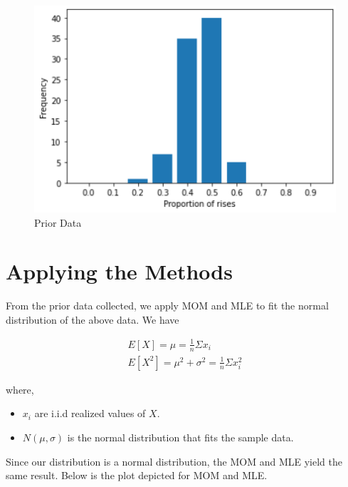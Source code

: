 \documentclass[conference]{IEEEtran}
\begin{document}
\begin{figure}[htbp]
    \centerline{\includegraphics[scale=0.85]{Images/FreqVsRise.png}}
    \caption{Prior Data}
    \label{fig}
\end{figure}


\section{Applying the Methods}
    \par From the prior data collected, we apply MOM and MLE to fit the normal distribution of the above data. We have
    
    \begin{gather*}
        E[X] = \mu = \frac{1}{n}\Sigma x_{i} \\ 
        E[X^2] = \mu^2 + \sigma^2 = \frac{1}{n}\Sigma x_{i}^{2}
    \end{gather*}
    
    where, 
    \begin{itemize}
        \item $x_i$ are i.i.d realized values of $X$.
        \item $N(\mu,\sigma)$ is the normal distribution that fits the sample data.
    \end{itemize}
    
    \par Since our distribution is a normal distribution, the MOM and MLE yield the same result. Below is the plot depicted for MOM and MLE.
    
\end{document}
